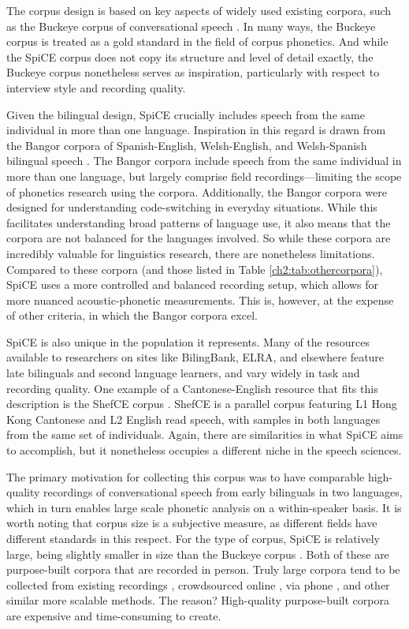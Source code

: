 The corpus design is based on key aspects of widely used existing corpora, such as the Buckeye corpus of conversational speech \citep{pitt_2005_buckeye}. In many ways, the Buckeye corpus is treated as a gold standard in the field of corpus phonetics. And while the SpiCE corpus does not copy its structure and level of detail exactly, the Buckeye corpus nonetheless serves as inspiration, particularly with respect to interview style and recording quality.

Given the bilingual design, SpiCE crucially includes speech from the same individual in more than one language. Inspiration in this regard is drawn from the Bangor corpora of Spanish-English, Welsh-English, and Welsh-Spanish bilingual speech \citep{deuchar_2014_corpora}. The Bangor corpora include speech from the same individual in more than one language, but largely comprise field recordings---limiting the scope of phonetics research using the corpora. Additionally, the Bangor corpora were designed for understanding code-switching in everyday situations. While this facilitates understanding broad patterns of language use, it also means that the corpora are not balanced for the languages involved. So while these corpora are incredibly valuable for linguistics research, there are nonetheless limitations. Compared to these corpora (and those listed in Table \ref{ch2:tab:othercorpora}), SpiCE uses a more controlled and balanced recording setup, which allows for more nuanced acoustic-phonetic measurements. This is, however, at the expense of other criteria, in which the Bangor corpora excel. 

SpiCE is also unique in the population it represents. Many of the resources available to researchers on sites like BilingBank, ELRA, and elsewhere feature late bilinguals and second language learners, and vary widely in task and recording quality. One example of a Cantonese-English resource that fits this description is the ShefCE corpus \citep{ng_shefce_2017}. ShefCE is a parallel corpus featuring L1 Hong Kong Cantonese and L2 English read speech, with samples in both languages from the same set of individuals. Again, there are similarities in what SpiCE aims to accomplish, but it nonetheless occupies a different niche in the speech sciences.

The primary motivation for collecting this corpus was to have comparable high-quality recordings of conversational speech from early bilinguals in two languages, which in turn enables large scale phonetic analysis on a within-speaker basis. It is worth noting that corpus size is a subjective measure, as different fields have different standards in this respect. For the type of corpus, SpiCE is relatively large, being slightly smaller in size than the Buckeye corpus \citep{pitt_2005_buckeye}. Both of these are purpose-built corpora that are recorded in person. Truly large corpora tend to be collected from existing recordings \citep[radio, YouTube, audiobooks, etc.; e.g., Librispeech:][]{panayotov_librispeech_2015}, crowdsourced online \citep[e.g. Mozilla Common Voice:][]{ardila_2020_common}, via phone \citep[e.g., SWITCHBOARD:][]{godfrey_switchboard_1992}, and other similar more scalable methods. The reason? High-quality purpose-built corpora are expensive and time-consuming to create. 

